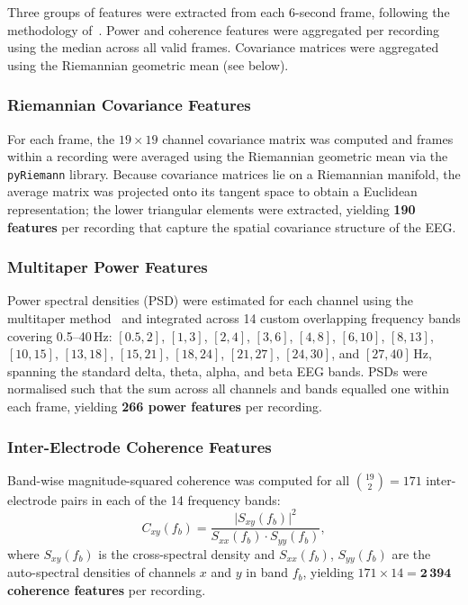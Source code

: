 \documentclass[preprint,12pt]{elsarticle}
\begin{document}
Three groups of features were extracted from each 6-second frame,
following the methodology of~\cite{poziomska2026quantity}.
Power and coherence features were aggregated per recording using the
median across all valid frames.
Covariance matrices were aggregated using the Riemannian geometric
mean (see below).

\subsubsection{Riemannian Covariance Features}

For each frame, the $19 \times 19$ channel covariance matrix was
computed and frames within a recording were averaged using the
Riemannian geometric mean via the \texttt{pyRiemann} library.
Because covariance matrices lie on a Riemannian manifold, the average
matrix was projected onto its tangent space to obtain a Euclidean
representation; the lower triangular elements were extracted,
yielding \textbf{190 features} per recording that capture the spatial
covariance structure of the EEG.

\subsubsection{Multitaper Power Features}

Power spectral densities (PSD) were estimated for each channel using
the multitaper method~\cite{thomson1982spectrum} and integrated across
14 custom overlapping frequency bands covering 0.5--40\,Hz:
$[0.5, 2]$, $[1, 3]$, $[2, 4]$, $[3, 6]$, $[4, 8]$, $[6, 10]$,
$[8, 13]$, $[10, 15]$, $[13, 18]$, $[15, 21]$, $[18, 24]$,
$[21, 27]$, $[24, 30]$, and $[27, 40]$\,Hz, spanning the standard
delta, theta, alpha, and beta EEG bands.
PSDs were normalised such that the sum across all channels and bands
equalled one within each frame, yielding \textbf{266 power features}
per recording.

\subsubsection{Inter-Electrode Coherence Features}

Band-wise magnitude-squared coherence was computed for all
$\binom{19}{2} = 171$ inter-electrode pairs in each of the 14
frequency bands:
\begin{equation}
  C_{xy}(f_b) = \frac{\bigl|S_{xy}(f_b)\bigr|^2}
                     {S_{xx}(f_b)\cdot S_{yy}(f_b)},
  \label{eq:coherence}
\end{equation}
where $S_{xy}(f_b)$ is the cross-spectral density and $S_{xx}(f_b)$,
$S_{yy}(f_b)$ are the auto-spectral densities of channels $x$ and $y$
in band $f_b$, yielding $171 \times 14 = \mathbf{2\,394}$
\textbf{coherence features} per recording.
\end{document}
